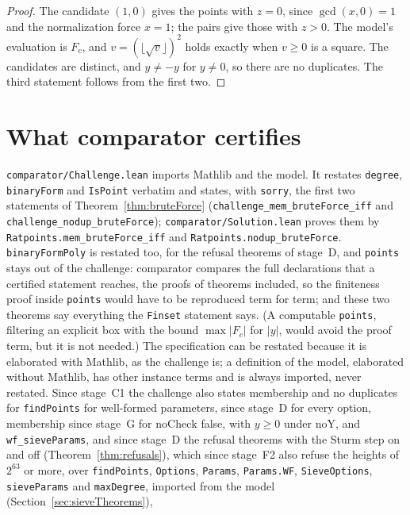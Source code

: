 \begin{proof}
  \leanok
  The candidate $(1, 0)$ gives the points with $z = 0$, since $\gcd(x, 0) = 1$ and the
  normalization force $x = 1$; the pairs give those with $z > 0$. The model's evaluation is
  $F_c$, and $v = (\lfloor \sqrt{v} \rfloor)^2$ holds exactly when $v \ge 0$ is a square. The
  candidates are distinct, and $y \ne -y$ for $y \ne 0$, so there are no duplicates. The third
  statement follows from the first two.
\end{proof}

\section{What comparator certifies}\label{sec:comparator-ab}

\verb|comparator/Challenge.lean| imports Mathlib and the model. It restates \verb|degree|,
\verb|binaryForm| and \verb|IsPoint| verbatim and states, with \verb|sorry|, the first two
statements of Theorem~\ref{thm:bruteForce} (\verb|challenge_mem_bruteForce_iff| and
\verb|challenge_nodup_bruteForce|); \verb|comparator/Solution.lean| proves them by
\verb|Ratpoints.mem_bruteForce_iff| and \verb|Ratpoints.nodup_bruteForce|. \verb|binaryFormPoly| is
restated too, for the refusal theorems of stage~D, and \verb|points| stays out of the challenge:
comparator compares the full declarations that a certified statement reaches, the proofs of theorems
included, so the finiteness proof inside \verb|points| would have to be reproduced term for term;
and these two theorems say everything the \verb|Finset| statement says. (A computable \verb|points|,
filtering an explicit box with the bound $\max |F_c|$ for $|y|$, would avoid the proof term, but it
is not needed.) The specification can be restated because it is elaborated with Mathlib, as the
challenge is; a definition of the model, elaborated without Mathlib, has other instance terms and is
always imported, never restated. Since stage~C1 the challenge also states membership and no
duplicates for \verb|findPoints| for well-formed parameters, since stage~D for every option,
membership since stage~G for $\mathrm{noCheck}$ false, with $y \ge 0$ under $\mathrm{noY}$, and
\verb|wf_sieveParams|, and since stage~D the refusal theorems with the Sturm step on and off
(Theorem~\ref{thm:refusals}), which since stage~F2 also refuse the heights of $2^{63}$ or more, over
\verb|findPoints|, \verb|Options|, \verb|Params|, \verb|Params.WF|, \verb|SieveOptions|,
\verb|sieveParams| and \verb|maxDegree|, imported from the model (Section~\ref{sec:sieveTheorems}),
